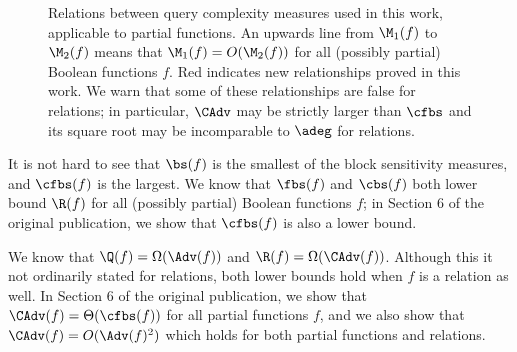 \begin{figure}
\centering
    \caption{Relations between query complexity
    measures used in this work, applicable to partial functions.
    An upwards line from $\M_1(f)$ to $\M_2(f)$ means
    that $\M_1(f)=O(\M_2(f))$ for all (possibly partial) Boolean
    functions $f$. {\color{red}Red} indicates new
    relationships proved in this work.
    We warn that some of these relationships
    are false for relations; in particular, $\CAdv$ may
    be strictly larger than $\cfbs$ and its square root
    may be incomparable to $\adeg$ for relations.
    \label{fig:relations}}
\end{figure}


It is not hard to see that $\bs(f)$ is the smallest
of the block sensitivity measures, and $\cfbs(f)$ is
the largest. We know \cite{Aar08,HN12}
that $\fbs(f)$ and $\cbs(f)$ both lower bound $\R(f)$
for all (possibly partial) Boolean functions $f$;
in Section 6 of the original publication, we show that $\cfbs(f)$ is also
a lower bound.

We know \cite{LM08,SS06,AKPV18} that
$\Q(f)=\Omega(\Adv(f))$ and $\R(f)=\Omega(\CAdv(f))$.
Although this it not ordinarily stated for relations,
both lower bounds hold when $f$ is a relation as well.
In Section 6 of the original publication, we show that
$\CAdv(f)=\Theta(\cfbs(f))$
for all partial functions $f$,
and we also show that
$\CAdv(f)=O(\Adv(f)^2)$
which holds for both partial functions and relations.

